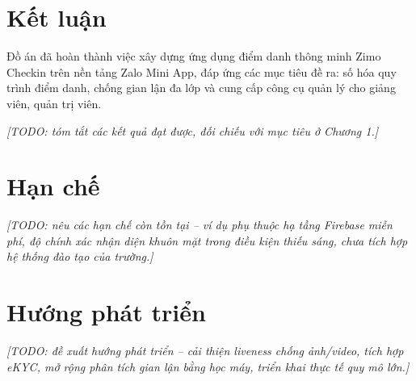 \documentclass[../main.tex]{subfiles}
\begin{document}
\section{Kết luận}
Đồ án đã hoàn thành việc xây dựng ứng dụng điểm danh thông minh Zimo Checkin trên nền tảng Zalo Mini App, đáp ứng các mục tiêu đề ra: số hóa quy trình điểm danh, chống gian lận đa lớp và cung cấp công cụ quản lý cho giảng viên, quản trị viên.

\textit{[TODO: tóm tắt các kết quả đạt được, đối chiếu với mục tiêu ở Chương 1.]}

\section{Hạn chế}
\textit{[TODO: nêu các hạn chế còn tồn tại -- ví dụ phụ thuộc hạ tầng Firebase miễn phí, độ chính xác nhận diện khuôn mặt trong điều kiện thiếu sáng, chưa tích hợp hệ thống đào tạo của trường.]}

\section{Hướng phát triển}
\textit{[TODO: đề xuất hướng phát triển -- cải thiện liveness chống ảnh/video, tích hợp eKYC, mở rộng phân tích gian lận bằng học máy, triển khai thực tế quy mô lớn.]}
\end{document}
